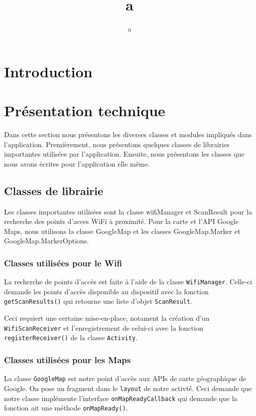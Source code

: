 \documentclass[12pt]{article}
\author{a}
\title{a}
\newcommand\code[1]{\texttt{#1}}
\begin{document}

\setcounter{page}{1}

\tableofcontents

\section{Introduction}

\section{Présentation technique}

	Dans cette section nous présentons les diverses classes et modules impliqués
	dans l'application.  Premièrement, nous présentons quelques classes de
	librairies importantes utilisées par l'application.  Ensuite, nous
	présentons les classes que nous avons écrites pour l'application elle même.

\subsection{Classes de librairie}

	Les classes importantes utilisées sont la classe wifiManager et ScanResult
	pour la recherche des points d'acces WiFi à proximité.  Pour la carte et
	l'API Google Maps, nous utilisons la classe GoogleMap et les classes
	GoogleMap.Marker et GoogleMap.MarkerOptions.

\subsubsection{Classes utilisées pour le Wifi}

	La recherche de points d'accès est faite à l'aide de la classe
	\code{WifiManager}.  Celle-ci demande les points d'accès disponible au
	dispositif avec la fonction \code{getScanResults()} qui retourne une liste
	d'objet \code{ScanResult}.

	Ceci requiert une certaine mise-en-place, notament la création d'un
	\code{WifiScanReceiver} et l'enregistrement de celui-ci avec la fonction
	\code{registerReceiver()} de la classe \code{Activity}.

\subsubsection{Classes utilisées pour les Maps}

	La classe \code{GoogleMap} est notre point d'accès aux APIs de carte
	géographique de Google.  On pose un fragment dans le \code{layout} de notre
	activté.  Ceci demande que notre classe implémente l'interface
	\code{onMapReadyCallback} qui demande que la fonction ait une méthode
	\code{onMapReady()}.
\end{document}
